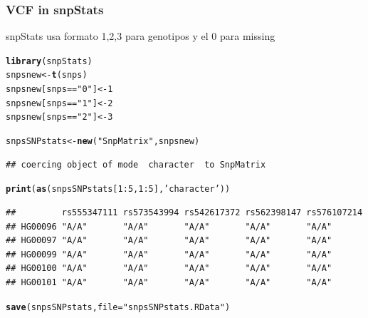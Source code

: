 \documentclass{beamer}\usepackage[]{graphicx}\usepackage[]{color}
\makeatletter
\newcommand{\hlnum}[1]{\textcolor[rgb]{0.686,0.059,0.569}{#1}}%
\newcommand{\hlstr}[1]{\textcolor[rgb]{0.192,0.494,0.8}{#1}}%
\newcommand{\hlopt}[1]{\textcolor[rgb]{0,0,0}{#1}}%
\newcommand{\hlstd}[1]{\textcolor[rgb]{0.345,0.345,0.345}{#1}}%
\newcommand{\hlkwb}[1]{\textcolor[rgb]{0.69,0.353,0.396}{#1}}%
\newcommand{\hlkwc}[1]{\textcolor[rgb]{0.333,0.667,0.333}{#1}}%
\newcommand{\hlkwd}[1]{\textcolor[rgb]{0.737,0.353,0.396}{\textbf{#1}}}%
\newenvironment{kframe}{%
 \def\at@end@of@kframe{}%
 \ifinner\ifhmode%
  \def\at@end@of@kframe{\end{minipage}}%
  \begin{minipage}{\columnwidth}%
 \fi\fi%
 \def\FrameCommand##1{\hskip\@totalleftmargin \hskip-\fboxsep
 \colorbox{shadecolor}{##1}\hskip-\fboxsep
     \hskip-\linewidth \hskip-\@totalleftmargin \hskip\columnwidth}%
 \MakeFramed {\advance\hsize-\width
   \@totalleftmargin\z@ \linewidth\hsize
   \@setminipage}}%
 {\par\unskip\endMakeFramed%
 \at@end@of@kframe}
\newenvironment{knitrout}{}{} %
\makeatother
\begin{document}
\begin{frame}[fragile]
\frametitle{VCF in snpStats}
snpStats usa formato 1,2,3 para genotipos y el 0 para missing
\begin{knitrout}\footnotesize
{}\color{fgcolor}\begin{kframe}
\begin{alltt}
\hlkwd{library}\hlstd{(snpStats)}
\hlstd{snpsnew}\hlkwb{<-}\hlkwd{t}\hlstd{(snps)}
\hlstd{snpsnew[snps}\hlopt{==}\hlstr{"0"}\hlstd{]} \hlkwb{<-} \hlnum{1}
\hlstd{snpsnew[snps}\hlopt{==}\hlstr{"1"}\hlstd{]} \hlkwb{<-} \hlnum{2}
\hlstd{snpsnew[snps}\hlopt{==}\hlstr{"2"}\hlstd{]} \hlkwb{<-} \hlnum{3}

\hlstd{snpsSNPstats} \hlkwb{<-} \hlkwd{new}\hlstd{(}\hlstr{"SnpMatrix"}\hlstd{, snpsnew)}
\end{alltt}
\begin{verbatim}
## coercing object of mode  character  to SnpMatrix
\end{verbatim}
\begin{alltt}
\hlkwd{print}\hlstd{(}\hlkwd{as}\hlstd{(snpsSNPstats[}\hlnum{1}\hlopt{:}\hlnum{5}\hlstd{,}\hlnum{1}\hlopt{:}\hlnum{5}\hlstd{],} \hlstr{'character'}\hlstd{))}
\end{alltt}
\begin{verbatim}
##         rs555347111 rs573543994 rs542617372 rs562398147 rs576107214
## HG00096 "A/A"       "A/A"       "A/A"       "A/A"       "A/A"      
## HG00097 "A/A"       "A/A"       "A/A"       "A/A"       "A/A"      
## HG00099 "A/A"       "A/A"       "A/A"       "A/A"       "A/A"      
## HG00100 "A/A"       "A/A"       "A/A"       "A/A"       "A/A"      
## HG00101 "A/A"       "A/A"       "A/A"       "A/A"       "A/A"
\end{verbatim}
\begin{alltt}
\hlkwd{save}\hlstd{(snpsSNPstats,} \hlkwc{file}\hlstd{=}\hlstr{"snpsSNPstats.RData"}\hlstd{)}
\end{alltt}
\end{kframe}
\end{knitrout}

\end{frame}
\end{document}
